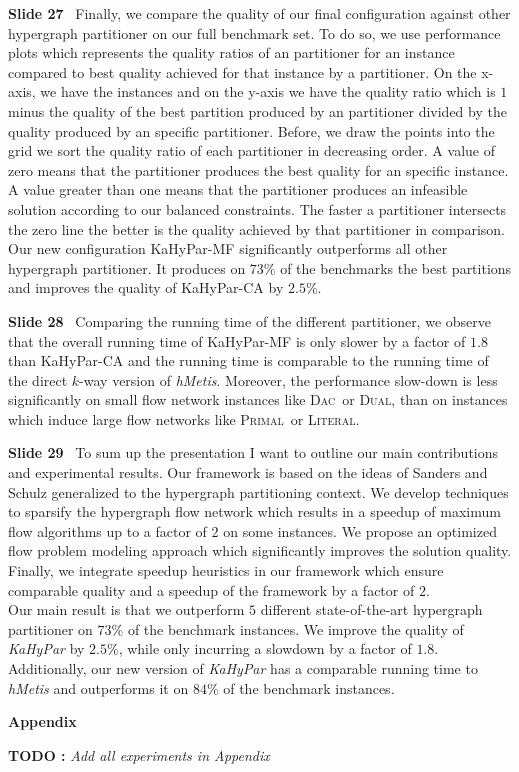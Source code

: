 \documentclass[11pt]{llncs}
\newcounter{todocount}
\newcommand{\todo}[1]{{\color{red}\textbf{TODO \the\value{todocount}:}
        \emph{#1} \addtocounter{todocount}{1}}}
\newcommand{\Dual}{\textsc{Dual}}
\newcommand{\Primal}{\textsc{Primal}}
\newcommand{\Literal}{\textsc{Literal}}
\newcommand{\DAC}{\textsc{Dac}}
\newcommand{\KaHyPar}[1]{KaHyPar-#1}
\newcommand{\fakepar}[1]{\medskip\par\textbf{#1}\ }
\begin{document}
\fakepar{Slide 27} Finally, we compare the quality of our final configuration against other
hypergraph partitioner on our full benchmark set. To do so, we use performance plots which represents
the quality ratios of an partitioner for an instance compared to best quality achieved for 
that instance by a partitioner. On the x-axis, we have the instances and on the y-axis 
we have the quality ratio which is  $1$ minus the quality of the best partition produced 
by an partitioner divided by the quality produced by an specific partitioner. 
Before, we draw the points into the grid we sort the quality ratio of each partitioner 
in decreasing order. A value of zero means that the partitioner produces the
best quality for an specific instance. A value greater than one means that the partitioner produces
an infeasible solution according to our balanced constraints. The faster a partitioner intersects the zero
line the better is the quality achieved by that partitioner in comparison. \\
Our new configuration \KaHyPar{MF} significantly outperforms all other hypergraph partitioner.
It produces on $73\%$ of the benchmarks the best partitions and improves
the quality of \KaHyPar{CA} by $2.5\%$. 

\fakepar{Slide 28} Comparing the running time of the different partitioner, we observe that the
overall running time of \KaHyPar{MF} is only slower by a factor of $1.8$ than \KaHyPar{CA} and the running
time is comparable to the running time of the direct $k$-way version of \emph{hMetis}. Moreover, the performance
slow-down is less significantly on small flow network instances like \DAC~or \Dual, than on instances which
induce large flow networks like \Primal~or \Literal.

\fakepar{Slide 29} To sum up the presentation I want to outline our main contributions and
experimental results. Our framework is based on the ideas of Sanders and Schulz generalized 
to the hypergraph partitioning context. We develop techniques to sparsify the hypergraph
flow network which results in a speedup of maximum flow algorithms up to a factor of $2$
on some instances. We propose an optimized flow problem modeling approach which significantly
improves the solution quality. Finally, we integrate speedup heuristics in our framework which
ensure comparable quality and a speedup of the framework by a factor of $2$.\\
Our main result is that we outperform $5$ different state-of-the-art hypergraph partitioner
on $73\%$ of the benchmark instances. We improve the quality of \emph{KaHyPar} by $2.5\%$, while
only incurring a slowdown by a factor of $1.8$. Additionally, our new version of \emph{KaHyPar}
has a comparable running time to \emph{hMetis} and outperforms it on $84\%$ of the benchmark 
instances.

\fakepar{Appendix} \todo{Add all experiments in Appendix}
\end{document}
